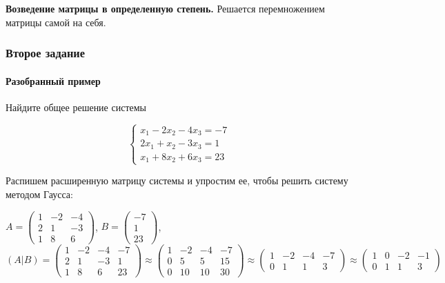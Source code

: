 \documentclass{article}
\begin{document}
\begin{flushleft}
\textbf{Возведение матрицы в определенную степень.} Решается перемножением матрицы самой на себя. 

\pagebreak
\subsubsection{Второе задание}

\paragraph{Разобранный пример}

Найдите общее решение системы

\begin{equation}
    \begin{cases}
        x_1 - 2x_2 - 4x_3 = -7 \\
        2x_1 + x_2 - 3x_3 = 1 \\
        x_1 + 8x_2 + 6x_3 = 23
    \end{cases}
\end{equation}

Распишем расширенную матрицу системы и упростим ее, чтобы решить систему методом Гаусса:

$A = \begin{pmatrix}
    1 & -2 & -4 \\
    2 & 1 & -3 \\
    1 & 8 & 6
\end{pmatrix}$, $B = \begin{pmatrix}
    -7 \\
    1 \\
    23
\end{pmatrix}$, $(A|B) = \begin{pmatrix}
    1 & -2 & -4 & -7 \\
    2 & 1 & -3 & 1 \\
    1 & 8 & 6 & 23
\end{pmatrix} \approx \begin{pmatrix}
    1 & -2 & -4 & -7 \\
    0 & 5 & 5 & 15 \\
    0 & 10 & 10 & 30
\end{pmatrix} \approx \begin{pmatrix}
    1 & -2 & -4 & -7 \\
    0 & 1 & 1 & 3
\end{pmatrix} \approx \begin{pmatrix}
    1 & 0 & -2 & -1 \\
    0 & 1 & 1 & 3
\end{pmatrix}$


\end{flushleft}
\end{document}
